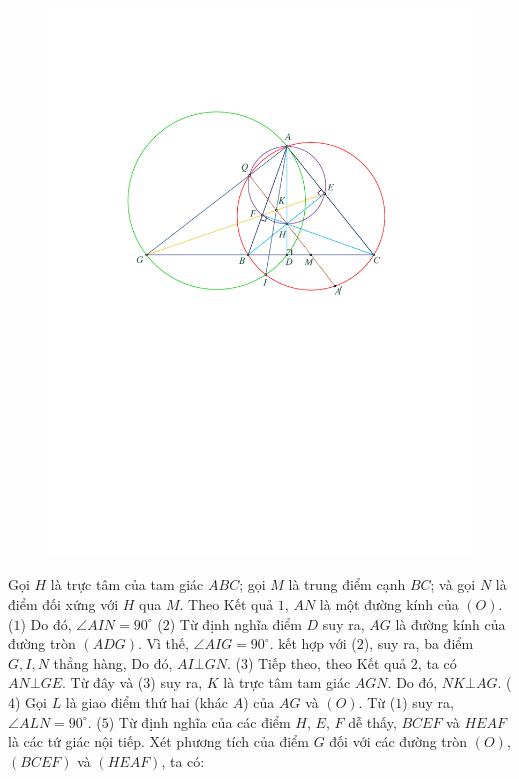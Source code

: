\begin{multicols}{2}
\begin{figure}[H]
		\includegraphics[width= 1\linewidth]{P595a}
		\vspace*{-10pt}
	\end{figure}
	Gọi $H$ là trực tâm của tam giác $ABC$; gọi $M$ là trung điểm cạnh $BC$; và gọi $N$ là điểm đối xứng với $H$ qua $M$.
	\vskip 0.05cm
	Theo Kết quả $1$, $AN$ là một đường kính của $(O)$.  \hfill   ($1$)
	\vskip 0.05cm
	Do đó, $\angle AIN = 90^\circ$ \hfill ($2$)
	\vskip 0.05cm
	Từ định nghĩa điểm $D$ suy ra, $AG$ là đường kính của đường tròn $(ADG)$. Vì thế, $\angle AIG = 90^\circ$.  kết hợp với ($2$), suy ra, ba điểm $G, I, N$ thẳng hàng, Do đó, $AI \bot GN$. \hfill  ($3$)
	\vskip 0.05cm
	Tiếp theo, theo Kết quả $2$, ta có $AN \bot GE$. Từ đây và ($3$) suy ra, $K$ là trực tâm tam giác $AGN$. Do đó, $NK \bot AG$. \hfill ($4$)
	\vskip 0.05cm
	Gọi $L$ là giao điểm thứ hai (khác $A$) của $AG$  và $(O)$. Từ ($1$) suy ra, $\angle ALN = 90^\circ$. \hfill  ($5$)
	\vskip 0.05cm
	Từ định nghĩa của các điểm $H$, $E$, $F$ dễ thấy, $BCEF$ và $HEAF$ là các tứ giác nội tiếp. Xét phương tích của điểm $G$ đối với các đường tròn $(O)$, $(BCEF)$ và $(HEAF)$, ta có:

\end{multicols}
